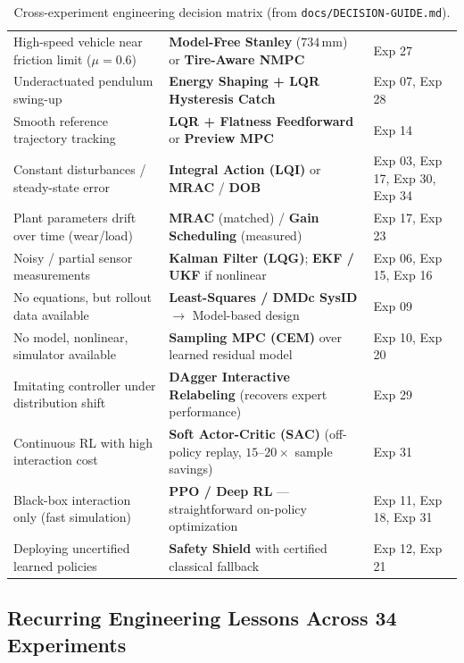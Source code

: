 \documentclass[11pt,a4paper]{article}
\begin{document}
\begin{table}[H]
{\begin{tabular}{@{}p{}p{}p{}@{}}
High-speed vehicle near friction limit ($\mu=0.6$) & \textbf{Model-Free Stanley} ($734\,\text{mm}$) or \textbf{Tire-Aware NMPC} & Exp 27 \\
Underactuated pendulum swing-up & \textbf{Energy Shaping + LQR Hysteresis Catch} & Exp 07, Exp 28 \\
Smooth reference trajectory tracking & \textbf{LQR + Flatness Feedforward} or \textbf{Preview MPC} & Exp 14 \\
Constant disturbances / steady-state error & \textbf{Integral Action (LQI)} or \textbf{MRAC} / \textbf{DOB} & Exp 03, Exp 17, Exp 30, Exp 34 \\
Plant parameters drift over time (wear/load) & \textbf{MRAC} (matched) / \textbf{Gain Scheduling} (measured) & Exp 17, Exp 23 \\
Noisy / partial sensor measurements & \textbf{Kalman Filter (LQG)}; \textbf{EKF / UKF} if nonlinear & Exp 06, Exp 15, Exp 16 \\
No equations, but rollout data available & \textbf{Least-Squares / DMDc SysID} $\to$ Model-based design & Exp 09 \\
No model, nonlinear, simulator available & \textbf{Sampling MPC (CEM)} over learned residual model & Exp 10, Exp 20 \\
Imitating controller under distribution shift & \textbf{DAgger Interactive Relabeling} (recovers expert performance) & Exp 29 \\
Continuous RL with high interaction cost & \textbf{Soft Actor-Critic (SAC)} (off-policy replay, $15\text{--}20\times$ sample savings) & Exp 31 \\
Black-box interaction only (fast simulation) & \textbf{PPO / Deep RL} --- straightforward on-policy optimization & Exp 11, Exp 18, Exp 31 \\
Deploying uncertified learned policies & \textbf{Safety Shield} with certified classical fallback & Exp 12, Exp 21 \\
\bottomrule
\end{tabular}%
}
\caption{Cross-experiment engineering decision matrix (from \texttt{docs/DECISION-GUIDE.md}).}
\label{tab:decision_guide}
\end{table}

\subsection{Recurring Engineering Lessons Across 34 Experiments}
\end{document}
